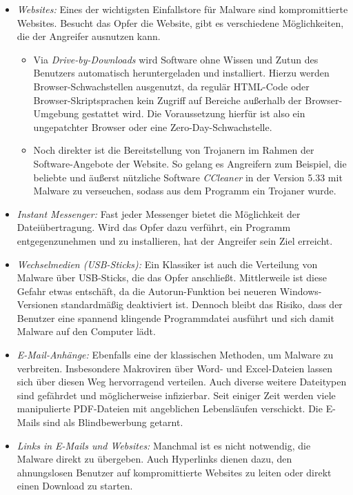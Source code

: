 \begin{itemize}
	\item \textit{Websites:} Eines der wichtigsten Einfallstore für Malware sind kompromittierte Websites. Besucht das Opfer die Website, gibt es verschiedene Möglichkeiten, die der Angreifer ausnutzen kann.
	\begin{itemize}
		\item Via \textit{Drive-by-Downloads} wird Software ohne Wissen und Zutun des Benutzers automatisch heruntergeladen und installiert. Hierzu werden Browser-Schwachstellen ausgenutzt, da regulär HTML-Code oder Browser-Skriptsprachen kein Zugriff auf Bereiche außerhalb der Browser-Umgebung gestattet wird. Die Voraussetzung hierfür ist also ein ungepatchter Browser oder eine Zero-Day-Schwachstelle.
		\item Noch direkter ist die Bereitstellung von Trojanern im Rahmen der Software-Angebote der Website. So gelang es Angreifern zum Beispiel, die beliebte und äußerst nützliche Software \textit{CCleaner} in der Version 5.33 mit Malware zu verseuchen, sodass aus dem Programm ein Trojaner wurde.
	\end{itemize}
	\item \textit{Instant Messenger:} Fast jeder Messenger bietet die Möglichkeit der Dateiübertragung. Wird das Opfer dazu verführt, ein Programm entgegenzunehmen und zu installieren, hat der Angreifer sein Ziel erreicht.
	\item \textit{Wechselmedien (USB-Sticks):} Ein Klassiker ist auch die Verteilung von Malware über USB-Sticks, die das Opfer anschließt. Mittlerweile ist diese Gefahr etwas entschäft, da die Autorun-Funktion bei neueren Windows-Versionen standardmäßig deaktiviert ist. Dennoch bleibt das Risiko, dass der Benutzer eine spannend klingende Programmdatei ausführt und sich damit Malware auf den Computer lädt.
	\item \textit{E-Mail-Anhänge:} Ebenfalls eine der klassischen Methoden, um Malware zu verbreiten. Insbesondere Makroviren über Word- und Excel-Dateien lassen sich über diesen Weg hervorragend verteilen. Auch diverse weitere Dateitypen sind gefährdet und möglicherweise infizierbar. Seit einiger Zeit werden viele manipulierte PDF-Dateien mit angeblichen Lebensläufen verschickt. Die E-Mails sind als Blindbewerbung getarnt.
	\item \textit{Links in E-Mails und Websites:} Manchmal ist es nicht notwendig, die Malware direkt zu übergeben. Auch Hyperlinks dienen dazu, den ahnungslosen Benutzer auf kompromittierte Websites zu leiten oder direkt einen Download zu starten.

\end{itemize}
